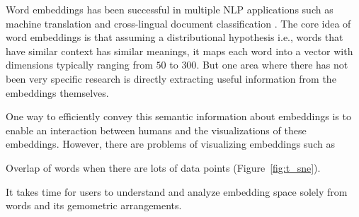 Word embeddings \cite{NIPS2013_5021} has been successful in multiple NLP applications such as machine translation \cite{lample2018unsupervised, artetxe2018unsupervised} and cross-lingual document classification \cite{klementiev-titov-bhattarai:2012:PAPERS}. 
The core idea of word embeddings is that assuming a distributional hypothesis \cite{harris54} i.e., words that have similar context has similar meanings, it maps each word into a vector with dimensions typically ranging from $50$ to $300$. 
But one area where there has not been very specific research is directly extracting useful information from the embeddings themselves. 

One way to efficiently convey this semantic information about embeddings is to enable an interaction between humans and the visualizations of these embeddings. However, there are problems of visualizing embeddings such as
\begin{itemize*}
  \item Overlap of words when there are lots of data points (Figure~\ref{fig:t_sne}). 
  \item It takes time for users to understand and analyze embedding space solely from words and its gemometric arrangements. 
\end{itemize*}

